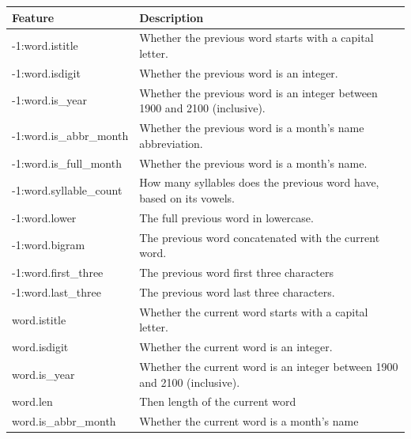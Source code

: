   \clearpage
  \begin{table}[ht]
    \centering
    \begin{tabular}{|p{0.3\linewidth}|p{0.7\linewidth}|}
      \hline
      \textbf{Feature} & \textbf{Description} \\
      \hline
      \rowcolor{dark_blue}
      -1:word.istitle & Whether the previous word starts with a capital letter.
      \\
      \hline
      \rowcolor{dark_blue}
      -1:word.isdigit & Whether the previous word is an integer. \\
      \hline
      \rowcolor{dark_blue}
      -1:word.is\_year & Whether the previous word is an integer between 1900
      and 2100 (inclusive). \\
      \hline
      \rowcolor{dark_blue}
      -1:word.is\_abbr\_month & Whether the previous word is a month's name
      abbreviation. \\
      \hline
      \rowcolor{dark_blue}
      -1:word.is\_full\_month & Whether the previous word is a month's name. \\
      \hline
      \rowcolor{dark_blue}
      -1:word.syllable\_count & How many syllables does the previous word have,
      based on its vowels. \\
      \hline
      \rowcolor{dark_blue}
      -1:word.lower & The full previous word in lowercase. \\
      \hline
      \rowcolor{dark_blue}
      -1:word.bigram & The previous word concatenated with the current word. \\
      \hline
      \rowcolor{pale_yellow}
      -1:word.first\_three & The previous word first three characters \\
      \hline
      \rowcolor{pale_yellow}
      -1:word.last\_three & The previous word last three characters. \\
      \hline
      \rowcolor{blue}
      word.istitle & Whether the current word starts with a capital letter. \\
      \hline
      \rowcolor{blue}
      word.isdigit & Whether the current word is an integer. \\
      \hline
      \rowcolor{blue}
      word.is\_year & Whether the current word is an integer between 1900
      and 2100 (inclusive). \\
      \hline
      \rowcolor{blue}
      word.len & Then length of the current word \\
      \hline
      \rowcolor{blue}
      word.is\_abbr\_month & Whether the current word is a month's name

\end{tabular}
\end{table}
